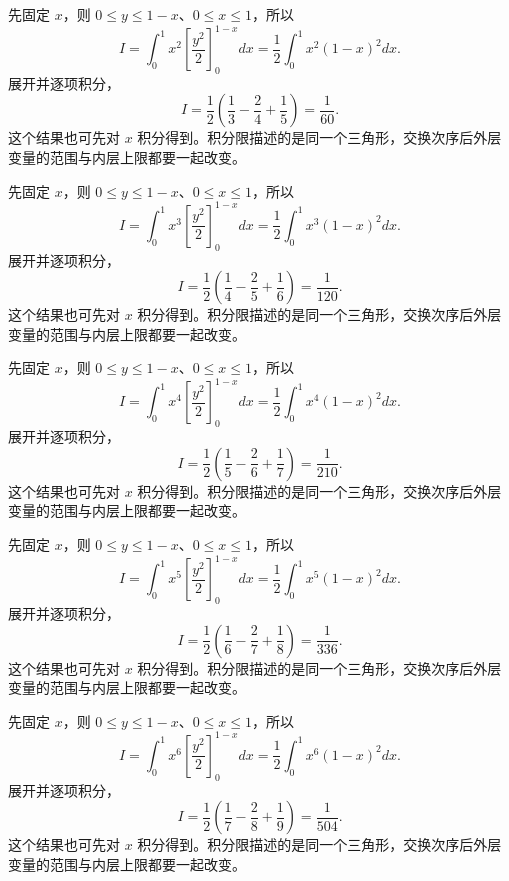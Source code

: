 \documentclass[UTF8,12pt,a4paper,fontset=fandol]{ctexart}
\begin{document}
\begin{solve}\label{ans:c36q9}
先固定 $x$，则 $0\le y\le1-x$、$0\le x\le1$，所以
\[
I=\int_0^1x^{2}\left[\frac{y^2}2\right]_0^{1-x}dx=\frac12\int_0^1x^{2}(1-x)^2dx.
\]
展开并逐项积分，
\[
I=\frac12\left(\frac1{3}-\frac2{4}+\frac1{5}\right)=\frac{1}{60}.
\]
这个结果也可先对 $x$ 积分得到。积分限描述的是同一个三角形，交换次序后外层变量的范围与内层上限都要一起改变。
\end{solve}

\begin{solve}\label{ans:c36q10}
先固定 $x$，则 $0\le y\le1-x$、$0\le x\le1$，所以
\[
I=\int_0^1x^{3}\left[\frac{y^2}2\right]_0^{1-x}dx=\frac12\int_0^1x^{3}(1-x)^2dx.
\]
展开并逐项积分，
\[
I=\frac12\left(\frac1{4}-\frac2{5}+\frac1{6}\right)=\frac{1}{120}.
\]
这个结果也可先对 $x$ 积分得到。积分限描述的是同一个三角形，交换次序后外层变量的范围与内层上限都要一起改变。
\end{solve}

\begin{solve}\label{ans:c36q11}
先固定 $x$，则 $0\le y\le1-x$、$0\le x\le1$，所以
\[
I=\int_0^1x^{4}\left[\frac{y^2}2\right]_0^{1-x}dx=\frac12\int_0^1x^{4}(1-x)^2dx.
\]
展开并逐项积分，
\[
I=\frac12\left(\frac1{5}-\frac2{6}+\frac1{7}\right)=\frac{1}{210}.
\]
这个结果也可先对 $x$ 积分得到。积分限描述的是同一个三角形，交换次序后外层变量的范围与内层上限都要一起改变。
\end{solve}

\begin{solve}\label{ans:c36q12}
先固定 $x$，则 $0\le y\le1-x$、$0\le x\le1$，所以
\[
I=\int_0^1x^{5}\left[\frac{y^2}2\right]_0^{1-x}dx=\frac12\int_0^1x^{5}(1-x)^2dx.
\]
展开并逐项积分，
\[
I=\frac12\left(\frac1{6}-\frac2{7}+\frac1{8}\right)=\frac{1}{336}.
\]
这个结果也可先对 $x$ 积分得到。积分限描述的是同一个三角形，交换次序后外层变量的范围与内层上限都要一起改变。
\end{solve}

\begin{solve}\label{ans:c36q13}
先固定 $x$，则 $0\le y\le1-x$、$0\le x\le1$，所以
\[
I=\int_0^1x^{6}\left[\frac{y^2}2\right]_0^{1-x}dx=\frac12\int_0^1x^{6}(1-x)^2dx.
\]
展开并逐项积分，
\[
I=\frac12\left(\frac1{7}-\frac2{8}+\frac1{9}\right)=\frac{1}{504}.
\]
这个结果也可先对 $x$ 积分得到。积分限描述的是同一个三角形，交换次序后外层变量的范围与内层上限都要一起改变。
\end{solve}
\end{document}
